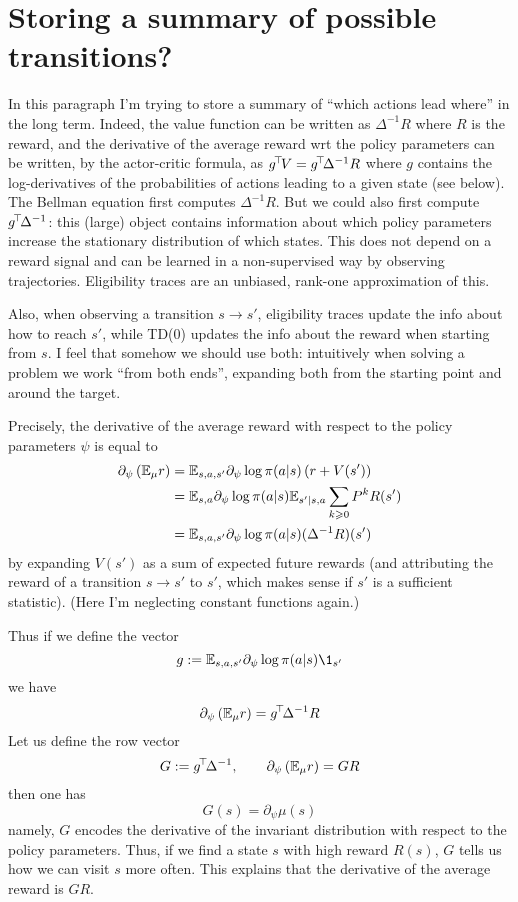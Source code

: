 \documentclass[11pt,a4paper]{article}
\begin{document}
\section{Storing a summary of possible transitions?}
\label{sec:green}

In this paragraph I'm trying to store a summary of ``which actions lead
where'' in the long term. Indeed, the value function can be written as
$\Delta^{-1}R$ where $R$ is the reward, and the derivative of the average
reward wrt the policy parameters can be written, by the actor-critic
formula, as $g^{\!\top}\!V=g^{\!\top}\!\Delta^{-1}R$ where $g$ contains the
log-derivatives of the probabilities of actions leading to a given state
(see below).
The Bellman equation first computes $\Delta^{-1}R$. But we could also
first compute $g^{\!\top}\!\Delta^{-1}$: this (large) object contains
information about which policy parameters increase the stationary
distribution of which states. This does not depend on a reward signal and
can be learned in a non-supervised way by observing trajectories.
Eligibility traces are an unbiased, rank-one approximation of this.

Also, when observing a transition $s\to s'$, eligibility traces update
the info about how to reach $s'$, while TD(0) updates the info about the
reward when starting from $s$. I feel that somehow we should use both:
intuitively when solving a problem we work ``from both ends'', expanding
both from the starting point and around the target.

Precisely, the derivative of the average reward with respect to the policy
parameters $\psi$ is equal to
\begin{align}
\partial_\psi \left(\mathbb{E}_\mu r\right)&=
\mathbb{E}_{s,a,s'} \partial_\psi \log \pi(a|s)\left(
r+V(s')
\right)
\\&=\mathbb{E}_{s,a}\partial_\psi \log \pi(a|s)\mathbb{E}_{s'|s,a}\sum_{k\geqslant 0}P^k R(s')
\\&=\mathbb{E}_{s,a,s'}\partial_\psi \log \pi(a|s)(\Delta^{-1}R)(s')
\end{align}
by expanding $V(s')$ as a sum of expected future rewards (and attributing
the reward of a transition $s\to s'$ to $s'$, which makes sense if $s'$
is a sufficient statistic).
(Here I'm neglecting constant functions again.)

Thus if we define the vector
\begin{equation}
g\deq \E_{s,a,s'}\partial_\psi \log \pi(a|s)\1_{s'}
\end{equation}
we have
\begin{equation}
\partial_\psi \left(\mathbb{E}_\mu r\right)=g^{\!\top}\!\Delta^{-1}R
\end{equation}
Let us define the row vector
\begin{equation}
G\mathrel{\mathop{:}}= g^{\!\top}\!\Delta^{-1},\qquad \partial_\psi \left(\mathbb{E}_\mu
r\right)=GR
\end{equation}
then one has
\begin{equation}
G(s)=\partial_\psi \mu(s)
\end{equation}
namely, $G$ encodes the derivative of the invariant distribution with
respect to the policy parameters. Thus, if we find a state $s$ with high
reward $R(s)$, $G$ tells us how we can visit $s$ more often. This
explains that the derivative of the average reward is $GR$.
\end{document}
